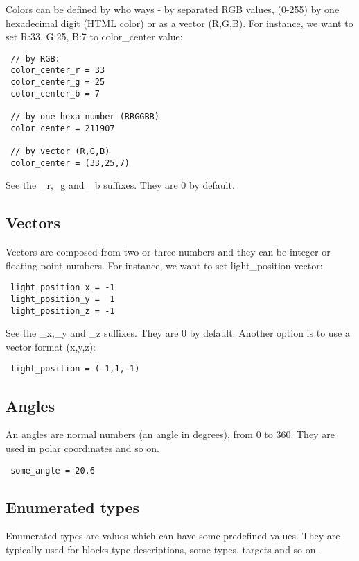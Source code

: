 \documentclass[11pt]{article}
\begin{document}
Colors can be defined by who ways - by separated RGB values,
(0-255) by one hexadecimal digit (HTML color) or as a vector (R,G,B). 
For instance, we want to set R:33, G:25, B:7 to color\_center value:

\begin{verbatim}
 // by RGB:
 color_center_r = 33
 color_center_g = 25
 color_center_b = 7
 
 // by one hexa number (RRGGBB)
 color_center = 211907
 
 // by vector (R,G,B)
 color_center = (33,25,7) 
\end{verbatim}

See the \_r,\_g and \_b suffixes. They are 0 by default.

\subsection{Vectors}

Vectors are composed from two or three numbers and they
can be integer or floating point numbers. For instance, we want to 
set light\_position vector:

\begin{verbatim}
 light_position_x = -1
 light_position_y =  1
 light_position_z = -1
\end{verbatim}

See the \_x,\_y and \_z suffixes. They are 0 by default. Another option is
to use a vector format (x,y,z):

\begin{verbatim}
 light_position = (-1,1,-1)
\end{verbatim}

\subsection{Angles}

An angles are normal numbers (an angle in degrees), from 0 to 360. 
They are used in polar coordinates and so on.

\begin{verbatim}
 some_angle = 20.6
\end{verbatim}

\subsection{Enumerated types}

Enumerated types are values which can have some predefined values. 
They are typically used for blocks type descriptions, some types,
targets and so on.
\end{document}
